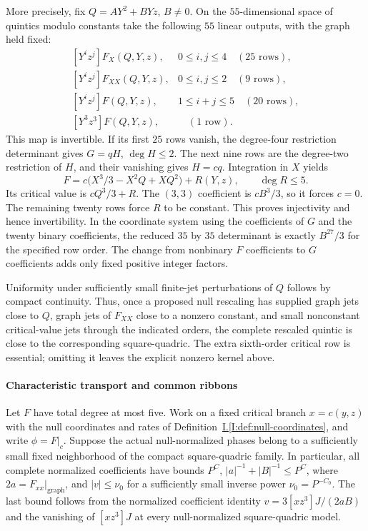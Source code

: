 \documentclass[11pt]{amsart}
\theoremstyle{definition}
\theoremstyle{remark}
\numberwithin{equation}{section}
\newcommand{\partIref}[1]{\hyperref[I:#1]{I.\ref*{I:#1}}}
\begin{document}
More precisely, fix $Q=AY^2+BYz$, $B\ne0$. On the $55$-dimensional space of quintics modulo constants take the following $55$ linear outputs, with the graph held fixed:
\[
 \begin{array}{ll}
 {}[Y^iz^j]F_X(Q,Y,z),&0\le i,j\le4\quad(25\text{ rows}),\\
 {}[Y^iz^j]F_{XX}(Q,Y,z),&0\le i,j\le2\quad(9\text{ rows}),\\
 {}[Y^iz^j]F(Q,Y,z),&1\le i+j\le5\quad(20\text{ rows}),\\
 {}[Y^3z^3]F(Q,Y,z),&\quad(1\text{ row}).
 \end{array}
\]
This map is invertible. If its first $25$ rows vanish, the degree-four restriction determinant gives $G=qH$, $\deg H\le2$. The next nine rows are the degree-two restriction of $H$, and their vanishing gives $H=cq$. Integration in $X$ yields
\[
F=c\bigl(X^3/3-X^2Q+XQ^2\bigr)+R(Y,z),\qquad \deg R\le5.
\]
Its critical value is $cQ^3/3+R$. The $(3,3)$ coefficient is $cB^3/3$, so it forces $c=0$. The remaining twenty rows force $R$ to be constant. This proves injectivity and hence invertibility. In the coordinate system using the coefficients of $G$ and the twenty binary coefficients, the reduced $35$ by $35$ determinant is exactly $B^{27}/3$ for the specified row order. The change from nonbinary $F$ coefficients to $G$ coefficients adds only fixed positive integer factors.

Uniformity under sufficiently small finite-jet perturbations of $Q$ follows by compact continuity. Thus, once a proposed null rescaling has supplied graph jets close to $Q$, graph jets of $F_{XX}$ close to a nonzero constant, and small nonconstant critical-value jets through the indicated orders, the complete rescaled quintic is close to the corresponding square-quadric. The extra sixth-order critical row is essential; omitting it leaves the explicit nonzero kernel above.

\paragraph{Characteristic transport and common ribbons}

Let $F$ have total degree at most five. Work on a fixed critical branch $x=c(y,z)$ with the null coordinates and rates of Definition~\partIref{def:null-coordinates}, and write $\phi=F|_c$. Suppose the actual null-normalized phases belong to a sufficiently small fixed neighborhood of the compact square-quadric family. In particular, all complete normalized coefficients have bounds $P^C$, $|a|^{-1}+|B|^{-1}\le P^C$, where $2a=F_{xx}|_{\mathrm{graph}}$, and $|v|\le\nu_0$ for a sufficiently small inverse power $\nu_0=P^{-C_0}$. The last bound follows from the normalized coefficient identity $v=3[xz^3]J/(2aB)$ and the vanishing of $[xz^3]J$ at every null-normalized square-quadric model.
\end{document}
